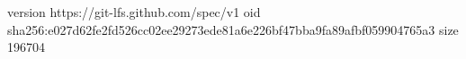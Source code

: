 version https://git-lfs.github.com/spec/v1
oid sha256:e027d62fe2fd526cc02ee29273ede81a6e226bf47bba9fa89afbf059904765a3
size 196704
